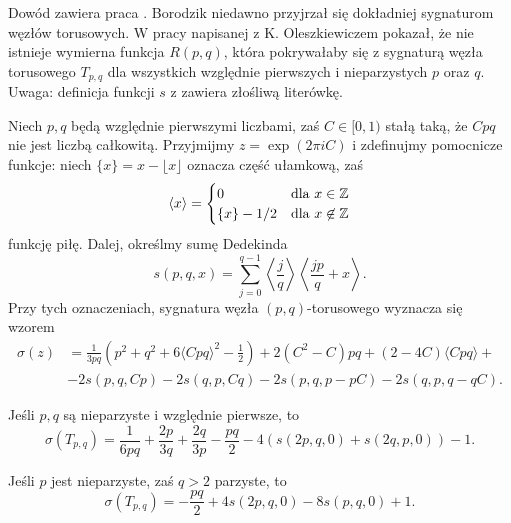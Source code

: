 Dowód zawiera praca \cite{litherland81}.
Borodzik niedawno przyjrzał się dokładniej sygnaturom węzłów torusowych.
W pracy \cite{borodzik10} napisanej z K. Oleszkiewiczem pokazał, że nie istnieje wymierna funkcja $R(p, q)$, która pokrywałaby się z sygnaturą węzła torusowego $T_{p, q}$ dla wszystkich względnie pierwszych i nieparzystych $p$ oraz $q$.
Uwaga: definicja funkcji $s$ z \cite{borodzik10} zawiera złośliwą literówkę.

\begin{proposition}
    Niech $p, q$ będą względnie pierwszymi liczbami, zaś $C \in [0, 1)$ stałą taką, że $Cpq$ nie jest liczbą całkowitą.
    Przyjmijmy $z = \exp (2 \pi i C)$ i zdefinujmy pomocnicze funkcje: niech $\{x\} = x - \lfloor x \rfloor$ oznacza część ułamkową, zaś
    \begin{equation}
        \langle x \rangle = \begin{cases}
            0 & \text{dla } x \in \mathbb Z \\
            \{x\} - 1/2 & \text{dla } x \not \in \mathbb Z
        \end{cases}
    \end{equation}
    funkcję piłę.
    Dalej, określmy sumę Dedekinda
    \begin{equation}
        s(p, q, x) = \sum_{j = 0}^{q-1} \left\langle \frac {j}{q} \right\rangle \left\langle \frac {jp}{q} + x \right\rangle.
    \end{equation}
    Przy tych oznaczeniach, sygnatura węzła $(p, q)$-torusowego wyznacza się wzorem
    \begin{align}
        \sigma(z) & = \frac{1}{3pq} \left (p^2 + q^2 + 6 \langle Cpq \rangle^2 - \frac {1}{2} \right)  + 2(C^2 - C) pq + (2-4C) \langle Cpq \rangle + {} \\
        & - 2s(p, q, Cp) - 2s(q, p, Cq) - 2s(p, q, p-pC) - 2s(q, p, q-qC). \nonumber
    \end{align}
\end{proposition}

\begin{corollary}
    Jeśli $p, q$ są nieparzyste i względnie pierwsze, to
    \begin{equation}
        \sigma(T_{p,q}) = \frac{1}{6pq} + \frac{2p}{3q} + \frac{2q}{3p} - \frac{pq}{2} - 4(s(2p, q, 0) + s(2q, p, 0)) - 1.
    \end{equation}
\end{corollary}

\begin{corollary}
    Jeśli $p$ jest nieparzyste, zaś $q > 2$ parzyste, to
    \begin{equation}
        \sigma(T_{p,q}) = - \frac{pq}{2} + 4s(2p, q, 0) - 8s(p, q, 0) + 1.
    \end{equation}
\end{corollary}

